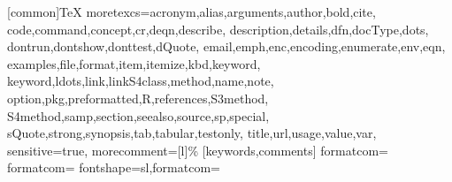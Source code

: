 %
\RequirePackage{color}
[common]{TeX}%
  {moretexcs={acronym,alias,arguments,author,bold,cite,%
          code,command,concept,cr,deqn,describe,%
          description,details,dfn,docType,dots,%
          dontrun,dontshow,donttest,dQuote,%
          email,emph,enc,encoding,enumerate,env,eqn,%
          examples,file,format,item,itemize,kbd,keyword,%
          keyword,ldots,link,linkS4class,method,name,note,%
          option,pkg,preformatted,R,references,S3method,%
          S4method,samp,section,seealso,source,sp,special,%
          sQuote,strong,synopsis,tab,tabular,testonly,%
          title,url,usage,value,var},
   sensitive=true,%
   morecomment=[l]\%%
}[keywords,comments]%
%
%
\global\def\Rlstset{\lstset{style=Rstyle}}%
\global\def\Rdlstset{\lstset{style=Rdstyle}}%
\Rlstset
%
  {formatcom=\color{Rcolor}\lstset{fancyvrb=true,escapechar='}}
%
  {formatcom=\color{Rout}\small\lstset{fancyvrb=false}}
%
  {fontshape=sl,formatcom=\color{Rcolor}\lstset{fancyvrb=true}}
